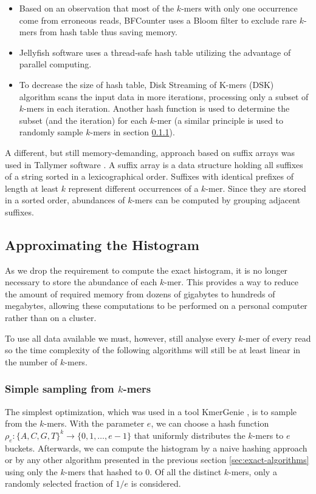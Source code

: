 \begin{itemize}
\item Based on an observation that most of the $k$-mers with only one occurrence come from erroneous reads,
BFCounter \cite{Melsted2011} uses a Bloom filter to exclude rare $k$-mers from hash table thus saving memory.

\item Jellyfish \cite{Marcais2011} software uses a thread-safe hash table utilizing the advantage of parallel computing.

\item To decrease the size of hash table, Disk Streaming of K-mers (DSK) \cite{Rizk2013} algorithm scans the input data in more
iterations, processing only a subset of $k$-mers in each iteration. Another hash function is used to determine the subset
(and the iteration) for each $k$-mer (a similar principle is used to randomly sample $k$-mers in section \ref{sec:simple-sampling}).
\end{itemize}

A different, but still memory-demanding, approach based on suffix arrays was used in Tallymer software \cite{Kurtz2008}.
A suffix array is a data structure holding all suffixes of a string sorted in a lexicographical order. Suffixes with identical
prefixes of length at least $k$ represent different occurrences of a $k$-mer. Since they are stored in a sorted order, 
abundances of $k$-mers can be computed by grouping adjacent suffixes. 

\subsection{Approximating the Histogram}
As we drop the requirement to compute the exact histogram, it is no longer necessary to store the abundance of each $k$-mer.
This provides a way to reduce the amount of required memory from dozens of gigabytes 
to hundreds of megabytes, allowing these computations to be performed on a personal computer rather than on a cluster.  

To use all data available we must, however, still analyse every $k$-mer of every read so the time complexity of the
following algorithms will still be at least linear in the number of $k$-mers.

\subsubsection{Simple sampling from $k$-mers}
\label{sec:simple-sampling}
The simplest optimization, which was used in a tool KmerGenie \cite{Chikhi2013}, is to sample from the $k$-mers.
With the parameter $e$, we can choose a hash function $\rho_e: \{A,C,G,T\}^k \rightarrow \{0, 1, \dots, e-1\}$ 
that uniformly distributes the $k$-mers to $e$ buckets. Afterwards, we can compute the histogram by a naive
hashing approach or by any other algorithm presented in the previous section \ref{sec:exact-algorithms} using only
the $k$-mers that hashed to 0. Of all the distinct $k$-mers, only a randomly selected fraction of $1/e$ is considered.

